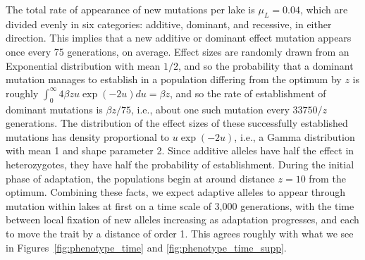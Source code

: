 \documentclass{article}
\begin{document}
The total rate of appearance of new mutations per lake is $\mu_L = 0.04$, which are divided evenly in six categories: additive, dominant, and recessive, in either direction. This implies that a new additive or dominant effect mutation appears once every 75 generations, on average. Effect sizes are randomly drawn from an Exponential distribution with mean $1/2$, 
and so the probability that a dominant mutation manages to establish in a population differing from the optimum by $z$ is roughly $\int_0^\infty 4 \beta z u \exp(-2u) du = \beta z$, 
and so the rate of establishment of dominant mutations is $\beta z / 75$, i.e., about one such mutation every $33750/z$ generations. 
The distribution of the effect sizes of these successfully established mutations 
has density proportional to $u \exp(-2u)$, i.e., a Gamma distribution with mean 1 and shape parameter 2. 
Since additive alleles have half the effect in heterozygotes, they have half the probability of establishment. 
During the initial phase of adaptation, the populations begin at around distance $z=10$ from the optimum. 
Combining these facts, we expect adaptive alleles to appear through mutation within lakes at first on a time scale of 3,000 generations, with the time between local fixation of new alleles increasing as adaptation progresses, and each to move the trait by a distance of order 1. This agrees roughly with what we see in Figures~\ref{fig:phenotype_time} and \ref{fig:phenotype_time_supp}.
\end{document}
